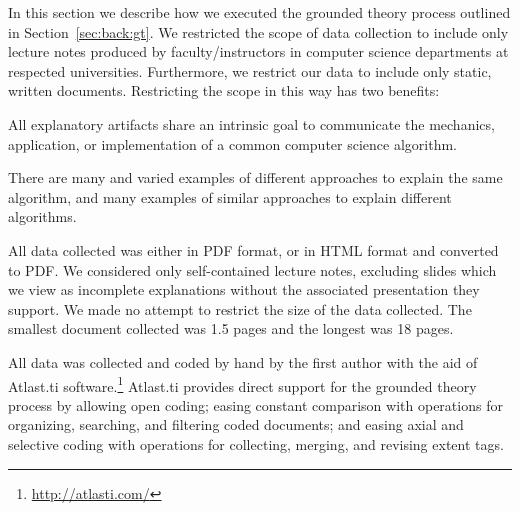 \documentclass[sigconf]{acmart}
\begin{document}
In this section we describe how we executed the grounded theory process
outlined in Section~\ref{sec:back:gt}.
%
We restricted the scope of data collection to include only lecture notes
produced by faculty/instructors in computer science departments at respected
universities. Furthermore, we restrict our data to include only static, written
documents. Restricting the scope in this way has two benefits:
%
\begin{enumerate*}
%
\item All explanatory artifacts share an intrinsic goal to communicate the
mechanics, application, or implementation of a common computer science
algorithm.
%
\item There are many and varied examples of different approaches to explain the
same algorithm, and many examples of similar approaches to explain different
algorithms.
%
%
  
\end{enumerate*}
%
All data collected was either in PDF format, or in HTML format and converted to
PDF. We considered only self-contained lecture notes, excluding slides which we
view as incomplete explanations without the associated presentation
they support. 
%
We made no attempt to restrict the size of the data collected. The smallest
document collected was 1.5 pages and the longest was 18 pages.


All data was collected and coded by hand by the first author with the aid of
Atlast.ti software.\footnote{\url{http://atlasti.com/}}
%
Atlast.ti provides direct support for the grounded theory process by allowing
open coding; easing constant comparison with operations for organizing,
searching, and filtering coded documents; and easing axial and selective coding
with operations for collecting, merging, and revising extent tags.
\end{document}
